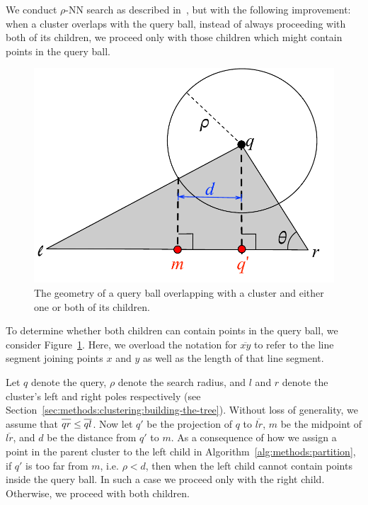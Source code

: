 We conduct $\rho$-NN search as described in~\cite{ishaq2019clustered}, but with the following improvement:
when a cluster overlaps with the query ball, instead of always proceeding with both of its children, we proceed only with those children which might contain points in the query ball.

\begin{figure}[ht!]
    \centering
    \includegraphics[scale=0.8]{images/geometry/overlapping-children-3.pdf}
    \caption{The geometry of a query ball overlapping with a cluster and either one or both of its children.}
    \label{fig:methods:overlapping-children}
\end{figure}

To determine whether both children can contain points in the query ball, we consider Figure~\ref{fig:methods:overlapping-children}.
Here, we overload the notation for $\overline{x y}$ to refer to the line segment joining points $x$ and $y$ as well as the length of that line segment.

Let $q$ denote the query, $\rho$ denote the search radius, and $l$ and $r$ denote the cluster's left and right poles respectively (see Section~\ref{sec:methods:clustering:building-the-tree}).
Without loss of generality, we assume that $\overline{q r \vphantom{l}} \leq \overline{q l}$.
Now let $q'$ be the projection of $q$ to $\overline{l r}$, $m$ be the midpoint of $\overline{l r}$, and $d$ be the distance from $q'$ to $m$.
As a consequence of how we assign a point in the parent cluster to the left child in Algorithm~\ref{alg:methods:partition}, if $q'$ is too far from $m$, i.e. $\rho < d$, then when the left child cannot contain points inside the query ball.
In such a case we proceed only with the right child.
Otherwise, we proceed with both children.

